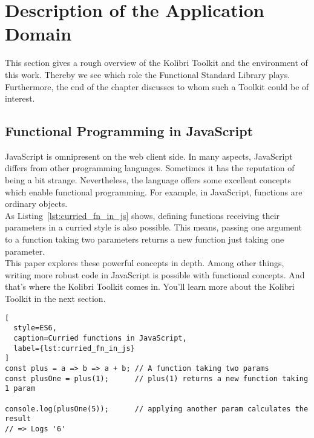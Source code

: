 \section{Description of the Application Domain}
\label{sec:Description of the Application Domain}
This section gives a rough overview of the Kolibri Toolkit and the environment
of this work. Thereby we see which role the Functional Standard Library plays.
Furthermore, the end of the chapter discusses to whom such a Toolkit could be of interest.

\subsection{Functional Programming in JavaScript}
\label{sub:Functional Programming in JavaScript}
JavaScript is omnipresent on the web client side. In many aspects, JavaScript
differs from other programming languages. Sometimes it has the reputation of
being a bit strange. Nevertheless, the language offers some excellent concepts
which enable functional programming. For example, in JavaScript, functions are
ordinary objects. \\
As Listing~\ref{lst:curried_fn_in_js} shows, defining functions receiving their
parameters in a curried style is also possible. This means, passing one
argument to a function taking two parameters returns a new function just taking
one parameter. \\ 
This paper explores these powerful concepts in depth. Among other things,
writing more robust code in JavaScript is possible with functional concepts.
And that’s where the Kolibri Toolkit comes in. You’ll learn more about the
Kolibri Toolkit in the next section.

\begin{lstlisting}[
  style=ES6,
  caption=Curried functions in JavaScript,
  label={lst:curried_fn_in_js}
]
const plus = a => b => a + b; // A function taking two params
const plusOne = plus(1);      // plus(1) returns a new function taking 1 param

console.log(plusOne(5));      // applying another param calculates the result
// => Logs '6'
\end{lstlisting}


